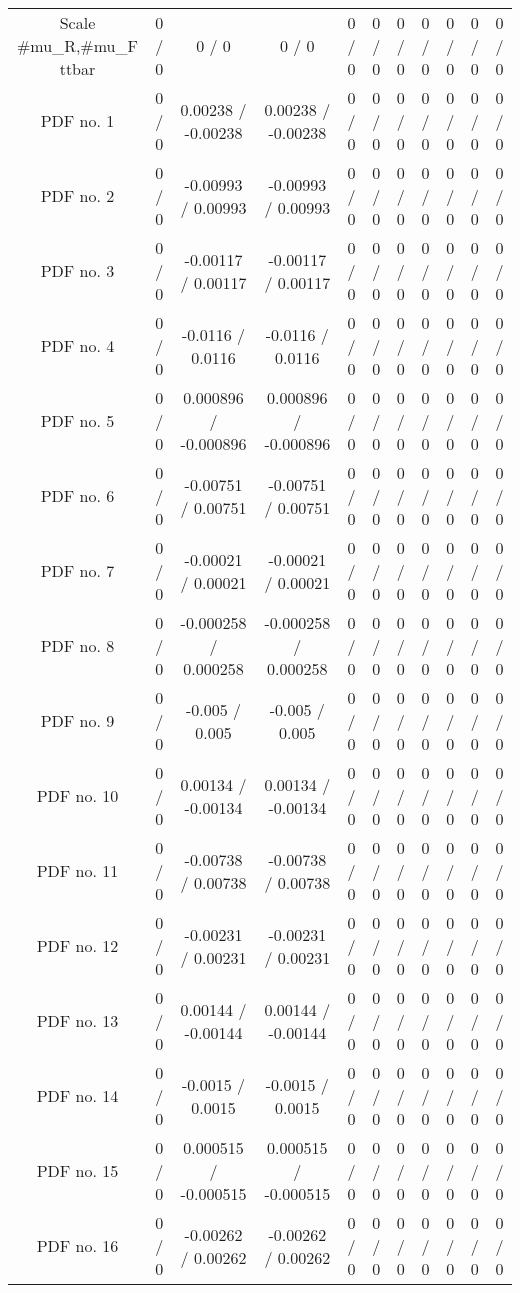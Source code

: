 \begin{table}[htbp]
\begin{center}
\begin{tabular}{|c|c|c|c|c|c|c|c|c|c|c|}
  Scale #mu_{R},#mu_{F} ttbar & 0 / 0 & 0 / 0 & 0 / 0 & 0 / 0 & 0 / 0 & 0 / 0 & 0 / 0 & 0 / 0 & 0 / 0 & 0 / 0 \\ 
  PDF no. 1 & 0 / 0 & 0.00238 / -0.00238 & 0.00238 / -0.00238 & 0 / 0 & 0 / 0 & 0 / 0 & 0 / 0 & 0 / 0 & 0 / 0 & 0 / 0 \\ 
  PDF no. 2 & 0 / 0 & -0.00993 / 0.00993 & -0.00993 / 0.00993 & 0 / 0 & 0 / 0 & 0 / 0 & 0 / 0 & 0 / 0 & 0 / 0 & 0 / 0 \\ 
  PDF no. 3 & 0 / 0 & -0.00117 / 0.00117 & -0.00117 / 0.00117 & 0 / 0 & 0 / 0 & 0 / 0 & 0 / 0 & 0 / 0 & 0 / 0 & 0 / 0 \\ 
  PDF no. 4 & 0 / 0 & -0.0116 / 0.0116 & -0.0116 / 0.0116 & 0 / 0 & 0 / 0 & 0 / 0 & 0 / 0 & 0 / 0 & 0 / 0 & 0 / 0 \\ 
  PDF no. 5 & 0 / 0 & 0.000896 / -0.000896 & 0.000896 / -0.000896 & 0 / 0 & 0 / 0 & 0 / 0 & 0 / 0 & 0 / 0 & 0 / 0 & 0 / 0 \\ 
  PDF no. 6 & 0 / 0 & -0.00751 / 0.00751 & -0.00751 / 0.00751 & 0 / 0 & 0 / 0 & 0 / 0 & 0 / 0 & 0 / 0 & 0 / 0 & 0 / 0 \\ 
  PDF no. 7 & 0 / 0 & -0.00021 / 0.00021 & -0.00021 / 0.00021 & 0 / 0 & 0 / 0 & 0 / 0 & 0 / 0 & 0 / 0 & 0 / 0 & 0 / 0 \\ 
  PDF no. 8 & 0 / 0 & -0.000258 / 0.000258 & -0.000258 / 0.000258 & 0 / 0 & 0 / 0 & 0 / 0 & 0 / 0 & 0 / 0 & 0 / 0 & 0 / 0 \\ 
  PDF no. 9 & 0 / 0 & -0.005 / 0.005 & -0.005 / 0.005 & 0 / 0 & 0 / 0 & 0 / 0 & 0 / 0 & 0 / 0 & 0 / 0 & 0 / 0 \\ 
  PDF no. 10 & 0 / 0 & 0.00134 / -0.00134 & 0.00134 / -0.00134 & 0 / 0 & 0 / 0 & 0 / 0 & 0 / 0 & 0 / 0 & 0 / 0 & 0 / 0 \\ 
  PDF no. 11 & 0 / 0 & -0.00738 / 0.00738 & -0.00738 / 0.00738 & 0 / 0 & 0 / 0 & 0 / 0 & 0 / 0 & 0 / 0 & 0 / 0 & 0 / 0 \\ 
  PDF no. 12 & 0 / 0 & -0.00231 / 0.00231 & -0.00231 / 0.00231 & 0 / 0 & 0 / 0 & 0 / 0 & 0 / 0 & 0 / 0 & 0 / 0 & 0 / 0 \\ 
  PDF no. 13 & 0 / 0 & 0.00144 / -0.00144 & 0.00144 / -0.00144 & 0 / 0 & 0 / 0 & 0 / 0 & 0 / 0 & 0 / 0 & 0 / 0 & 0 / 0 \\ 
  PDF no. 14 & 0 / 0 & -0.0015 / 0.0015 & -0.0015 / 0.0015 & 0 / 0 & 0 / 0 & 0 / 0 & 0 / 0 & 0 / 0 & 0 / 0 & 0 / 0 \\ 
  PDF no. 15 & 0 / 0 & 0.000515 / -0.000515 & 0.000515 / -0.000515 & 0 / 0 & 0 / 0 & 0 / 0 & 0 / 0 & 0 / 0 & 0 / 0 & 0 / 0 \\ 
  PDF no. 16 & 0 / 0 & -0.00262 / 0.00262 & -0.00262 / 0.00262 & 0 / 0 & 0 / 0 & 0 / 0 & 0 / 0 & 0 / 0 & 0 / 0 & 0 / 0 \\ 

\end{tabular}
\end{center}
\end{table}
